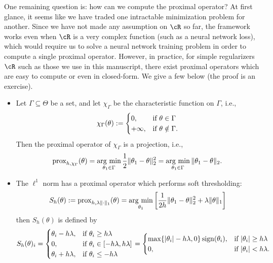 \documentclass[../../book-main.tex]{subfiles}
\begin{document}
One remaining question is: how can we compute the proximal operator? At first glance, it seems like we have traded one intractable minimization problem for another. Since we have not made any assumption on \(\cR\) so far, the framework works even when \(\cR\) is a very complex function (such as a neural network loss), which would require us to solve a neural network training problem in order to compute a single proximal operator. However, in practice, for simple regularizers \(\cR\) such as those we use in this manuscript, there exist proximal operators which are easy to compute or even in closed-form. We give a few below (the proof is an exercise).
\begin{itemize}
    \item Let \(\Gamma \subseteq \Theta\) be a set, and let \(\chi_{\Gamma}\) be the characteristic function on \(\Gamma\), i.e.,
    \begin{equation}
        \chi_{\Gamma}(\theta) := \begin{cases}0, & \text{if}\ \theta \in \Gamma \\ +\infty, & \text{if}\ \theta \notin \Gamma.\end{cases}
    \end{equation}
    Then the proximal operator of \(\chi_{\Gamma}\) is a projection, i.e.,
    \begin{equation}
        \prox_{h, \chi_{\Gamma}}(\theta) = \argmin_{\theta_{1} \in \Gamma}\frac{1}{2}\norm{\theta_{1} - \theta}_{2}^{2} = \argmin_{\theta_{1} \in \Gamma}\norm{\theta_{1} - \theta}_{2}.
    \end{equation}
    \item The \(\ell^{1}\) norm has a proximal operator which performs soft thresholding:
    \begin{equation}
        S_{h}(\theta) := \prox_{h, \lambda \norm{\cdot}_{1}}(\theta) = \argmin_{\theta_{1}}\bs{\frac{1}{2h}\norm{\theta_{1} - \theta}_{2}^{2} + \lambda\norm{\theta}_{1}}
    \end{equation}
    then \(S_{h}(\theta)\) is defined by 
    \begin{equation}
        S_{h}(\theta)_{i} = \casework{\theta_{i} - h\lambda, & \text{if}\ \theta_{i} \geq h\lambda \\ 0, & \text{if}\ \theta_{i} \in [-h\lambda, h\lambda] \\ \theta_{i} + h\lambda, & \text{if}\ \theta_{i} \leq -h\lambda} = \casework{\max\{\abs{\theta_{i}} - h\lambda, 0\}\sign(\theta_{i}), & \text{if}\ \abs{\theta_{i}} \geq h\lambda \\ 0, & \text{if}\ \abs{\theta_{i}} < h\lambda.}
    \end{equation}

\end{itemize}
\end{document}

